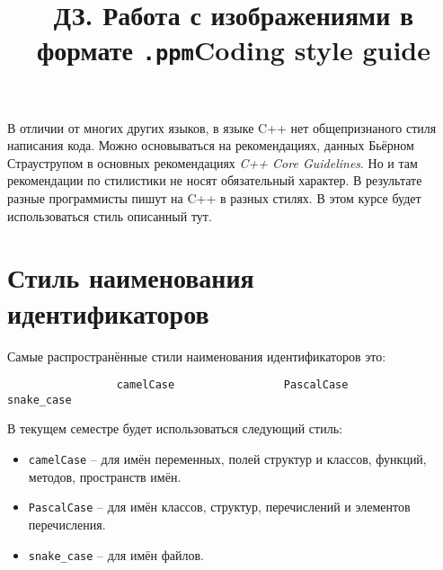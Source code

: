 \documentclass{article}
\title{ДЗ. Работа с изображениями в формате \texttt{.ppm}}
\date{}
\begin{document}


\title{Coding style guide}\date{}\maketitle
В отличии от многих других языков, в языке C++ нет общепризнаного стиля написания кода. Можно основываться на рекомендациях, данных Бьёрном Страуструпом в основных рекомендациях \textit{C++ Core Guidelines}. Но и там рекомендации по стилистики не носят обязательный характер. В результате разные программисты пишут на C++ в разных стилях. В этом курсе будет использоваться стиль описанный тут.

\section{Стиль наименования идентификаторов}
Самые распространённые стили наименования идентификаторов это:
\begin{verbatim}
                 camelCase                 PascalCase              snake_case    
\end{verbatim}
В текущем семестре будет использоваться следующий стиль:
\begin{itemize}
\item \texttt{camelCase} -- для имён переменных, полей структур и классов, функций, методов, пространств имён.
\item \texttt{PascalCase} -- для имён классов, структур, перечислений и элементов перечисления.
\item \texttt{snake\_case} --  для имён файлов.
\end{itemize}
\end{document}
